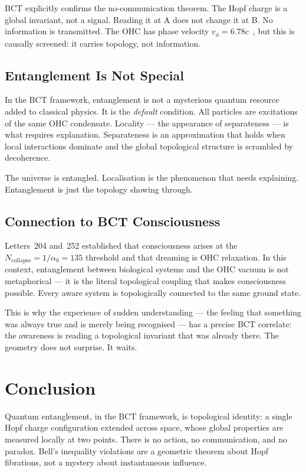 \documentclass[aps,prl,twocolumn,showpacs,preprintnumbers]{revtex4-2}
\newcommand{\azero}{\alpha_0}
\begin{document}
BCT explicitly confirms the no-communication theorem.
The Hopf charge is a global invariant, not a signal.
Reading it at A does not change it at B. No information
is transmitted. The OHC has phase velocity
$v_\phi = 6.78c$~\cite{l36}, but this is causally screened:
it carries topology, not information.

\subsection{Entanglement Is Not Special}

In the BCT framework, entanglement is not a mysterious
quantum resource added to classical physics. It is the
\emph{default} condition. All particles are excitations
of the same OHC condensate. Locality --- the appearance
of separateness --- is what requires explanation. Separateness
is an approximation that holds when local interactions
dominate and the global topological structure is scrambled
by decoherence.

The universe is entangled. Localisation is the phenomenon
that needs explaining. Entanglement is just the topology
showing through.

\subsection{Connection to BCT Consciousness}

Letters~204 and~252 established that consciousness arises
at the $N_{\mathrm{collapse}} = 1/\azero = 135$ threshold
and that dreaming is OHC relaxation. In this context,
entanglement between biological systems and the OHC vacuum
is not metaphorical --- it is the literal topological coupling
that makes consciousness possible. Every aware system is
topologically connected to the same ground state.

This is why the experience of sudden understanding --- the
feeling that something was always true and is merely being
recognised --- has a precise BCT correlate: the awareness
is reading a topological invariant that was already there.
The geometry does not surprise. It waits.

\section{Conclusion}

Quantum entanglement, in the BCT framework, is topological
identity: a single Hopf charge configuration extended across
space, whose global properties are measured locally at two
points. There is no action, no communication, and no paradox.
Bell's inequality violations are a geometric theorem about
Hopf fibrations, not a mystery about instantaneous influence.
\end{document}
